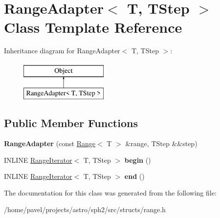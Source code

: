 \hypertarget{classRangeAdapter}{}\section{Range\+Adapter$<$ T, T\+Step $>$ Class Template Reference}
\label{classRangeAdapter}
Inheritance diagram for Range\+Adapter$<$ T, T\+Step $>$\+:\begin{figure}[H]
\begin{center}
\leavevmode
\includegraphics[height=2.000000cm]{classRangeAdapter}
\end{center}
\end{figure}
\subsection*{Public Member Functions}
\begin{DoxyCompactItemize}
\item 
\hypertarget{classRangeAdapter_af126cdb4cd1981498478a9f1c8b1ecc6}{}\label{classRangeAdapter_af126cdb4cd1981498478a9f1c8b1ecc6} 
{\bfseries Range\+Adapter} (const \hyperlink{classRange}{Range}$<$ T $>$ \&range, T\+Step \&\&step)
\item 
\hypertarget{classRangeAdapter_a27b7dce9ff6601b03050dcb5039d17d0}{}\label{classRangeAdapter_a27b7dce9ff6601b03050dcb5039d17d0} 
I\+N\+L\+I\+NE \hyperlink{classRangeIterator}{Range\+Iterator}$<$ T, T\+Step $>$ {\bfseries begin} ()
\item 
\hypertarget{classRangeAdapter_a11c3ceedfc37333ec9e2665250db448a}{}\label{classRangeAdapter_a11c3ceedfc37333ec9e2665250db448a} 
I\+N\+L\+I\+NE \hyperlink{classRangeIterator}{Range\+Iterator}$<$ T, T\+Step $>$ {\bfseries end} ()
\end{DoxyCompactItemize}


The documentation for this class was generated from the following file\+:\begin{DoxyCompactItemize}
\item 
/home/pavel/projects/astro/sph2/src/structs/range.\+h\end{DoxyCompactItemize}
